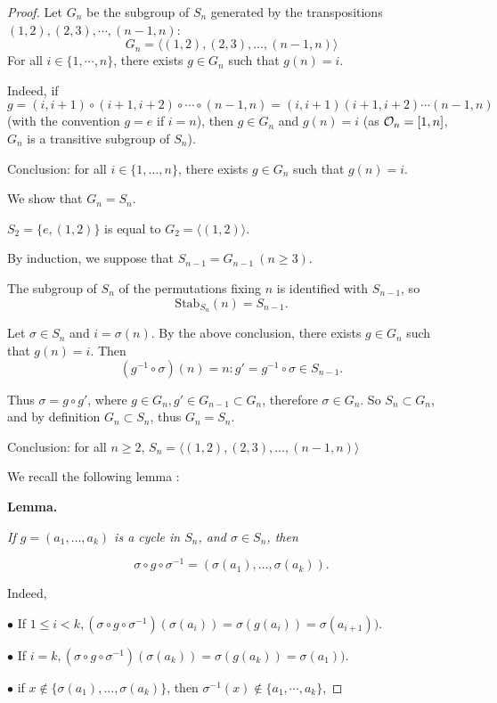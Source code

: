\documentclass[11pt,a4paper]{article}
\begin{document}
\begin{proof}
Let $G_n$  be the subgroup of $S_n$ generated by the transpositions $(1,2),(2,3),\cdots,{(n-1,n)}$:
$$G_n=\langle (1,2), (2,3),\ldots,(n-1,n) \rangle$$
 For all $i\in \{1,\cdots,n\}$, there exists $g\in G_n$ such that $g(n) = i$.

Indeed, if  $g = (i,i+1) \circ (i+1,i+2)\circ \cdots \circ (n-1,n)  =  (i,i+1) (i+1,i+2)\cdots (n-1,n)$  (with the convention $g=e$ if $i=n$), then  $g \in G_n$ and $g(n) = i$
(as ${\cal O}_n = [1,n]$, $G_n$ is a transitive subgroup of $S_n$).

Conclusion: for all $i \in \{1,\ldots,n\}$, there exists $g \in G_n$ such that $g(n) = i$.

\bigskip

We show that $G_n = S_n$.

$S_2 = \{e,(1,2)\}$ is equal to  $G_2=\langle (1,2) \rangle$.

By induction, we suppose that $S_{n-1} = G_{n-1}\ (n\geq 3)$.

The subgroup of  $S_n$ of the permutations fixing $n$ is identified with $S_{n-1}$, so
$$\mathrm{Stab}_{S_n}(n) = S_{n-1}.$$

Let $\sigma \in S_n$ and $i = \sigma(n)$.
By the above conclusion, there exists $g \in G_n$ such that $g(n) = i$. 
Then $$(g^{-1} \circ \sigma)(n) = n :  g' = g^{-1} \circ \sigma \in S_{n-1}.$$

Thus $\sigma = g \circ g'$, where $g \in G_n, g' \in G_{n-1} \subset G_n$, therefore $\sigma \in G_n$.
So $S_n \subset G_n$, and by definition $G_n \subset S_n$, thus $G_n = S_n$.

Conclusion: for all $n\geq 2$, $S_n = \langle (1,2), (2,3),\ldots,(n-1,n) \rangle$

\bigskip

We recall the following lemma :

{\bf Lemma. }{\it If $g=(a_1,\ldots,a_k)$ is a cycle in $S_n$, and $\sigma \in S_n$, then

$$\sigma \circ g \circ \sigma^{-1} = (\sigma(a_1),\ldots, \sigma(a_k)).$$}

Indeed,

$\bullet$ If $1 \leq i <k, (\sigma \circ g \circ \sigma^{-1})(\sigma(a_i)) = \sigma(g(a_i)) = \sigma(a_{i+1}))$.

$\bullet$ If $i = k, (\sigma \circ g \circ \sigma^{-1})(\sigma(a_k)) = \sigma(g(a_k)) = \sigma(a_1))$.

$\bullet$ if $x \not \in \{\sigma(a_1),\ldots,\sigma(a_k)\}$, then $\sigma^{-1}(x) \not \in \{a_1,\cdots,a_k\}$,


\end{proof}
\end{document}
